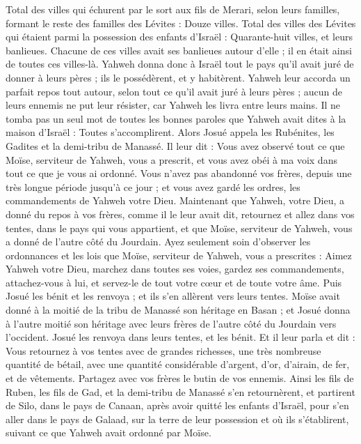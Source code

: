 \begin{multicols}{2}
Total des villes qui échurent par le sort aux fils de Merari, selon leurs familles, formant le reste des familles des Lévites : Douze villes.
Total des villes des Lévites qui étaient parmi la possession des enfants d’Israël : Quarante-huit villes, et leurs banlieues.
Chacune de ces villes avait ses banlieues autour d’elle ; il en était ainsi de toutes ces villes-là.
Yahweh donna donc à Israël tout le pays qu’il avait juré de donner à leurs pères ; ils le possédèrent, et y habitèrent.
Yahweh leur accorda un parfait repos tout autour, selon tout ce qu’il avait juré à leurs pères ; aucun de leurs ennemis ne put leur résister, car Yahweh les livra entre leurs mains.
Il ne tomba pas un seul mot de toutes les bonnes paroles que Yahweh avait dites à la maison d'Israël : Toutes s’accomplirent.
\VerseOne{}Alors Josué appela les Rubénites, les Gadites et la demi-tribu de Manassé.
Il leur dit : Vous avez observé tout ce que Moïse, serviteur de Yahweh, vous a prescrit, et vous avez obéi à ma voix dans tout ce que je vous ai ordonné.
Vous n’avez pas abandonné vos frères, depuis une très longue période jusqu’à ce jour ; et vous avez gardé les ordres, les commandements de Yahweh votre Dieu.
Maintenant que Yahweh, votre Dieu, a donné du repos à vos frères, comme il le leur avait dit, retournez et allez dans vos tentes, dans le pays qui vous appartient, et que Moïse, serviteur de Yahweh, vous a donné de l’autre côté du Jourdain.
Ayez seulement soin d’observer les ordonnances et les lois que Moïse, serviteur de Yahweh, vous a prescrites : Aimez Yahweh votre Dieu, marchez dans toutes ses voies, gardez ses commandements, attachez-vous à lui, et servez-le de tout votre cœur et de toute votre âme.
Puis Josué les bénit et les renvoya ; et ils s’en allèrent vers leurs tentes.
Moïse avait donné à la moitié de la tribu de Manassé son héritage en Basan ; et Josué donna à l’autre moitié son héritage avec leurs frères de l’autre côté du Jourdain vers l’occident. Josué les renvoya dans leurs tentes, et les bénit.
Et il leur parla et dit : Vous retournez à vos tentes avec de grandes richesses, une très nombreuse quantité de bétail, avec une quantité considérable d’argent, d’or, d’airain, de fer, et de vêtements. Partagez avec vos frères le butin de vos ennemis.
Ainsi les fils de Ruben, les fils de Gad, et la demi-tribu de Manassé s’en retournèrent, et partirent de Silo, dans le pays de Canaan, après avoir quitté les enfants d’Israël, pour s’en aller dans le pays de Galaad, sur la terre de leur possession et où ils s’établirent, suivant ce que Yahweh avait ordonné par Moïse.

\end{multicols}
